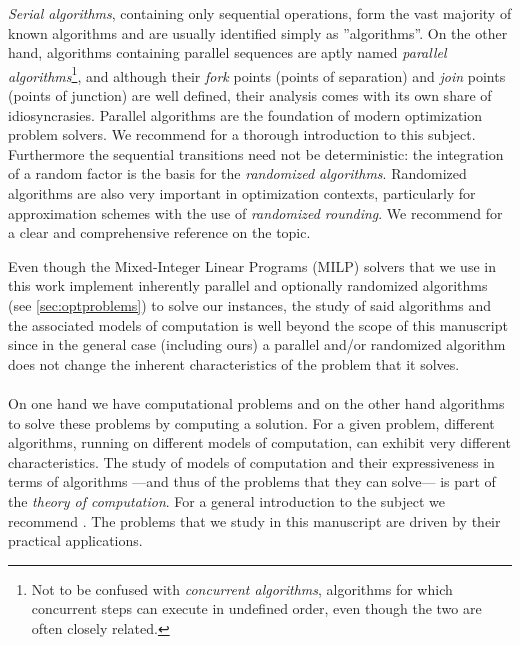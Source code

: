 	\emph{Serial algorithms}, containing only sequential operations, form the vast majority of known algorithms and are usually identified simply as ''algorithms''.
	On the other hand, algorithms containing parallel sequences are aptly named \emph{parallel algorithms}\footnote{Not to be confused with \emph{concurrent algorithms}, algorithms for which concurrent steps can execute in undefined order, even though the two are often closely related.}, and although their \emph{fork} points (points of separation) and \emph{join} points (points of junction) are well defined, their analysis comes with its own share of idiosyncrasies.
	Parallel algorithms are the foundation of modern optimization problem solvers.
	We recommend \parencite{jada1992introduction} for a thorough introduction to this subject.
	Furthermore the sequential transitions need not be deterministic: the integration of a random factor is the basis for the \emph{randomized algorithms}.
	Randomized algorithms are also very important in optimization contexts, particularly for approximation schemes with the use of \emph{randomized rounding}.
	We recommend \parencite[Chapters~5 and 6]{williamson2011design} for a clear and comprehensive reference on the topic.

	Even though the Mixed-Integer Linear Programs (MILP) solvers that we use in this work implement inherently parallel and optionally randomized algorithms (see \cref{sec:optproblems}) to solve our instances, the study of said algorithms and the associated models of computation is well beyond the scope of this manuscript since in the general case (including ours) a parallel and/or randomized algorithm does not change the inherent characteristics of the problem that it solves.

	\paragraph{}
	On one hand we have computational problems and on the other hand algorithms to solve these problems %
		by computing a solution.
	For a given problem, different algorithms, running on different models of computation, can exhibit very different characteristics. %
	The study of models of computation and their expressiveness in terms of algorithms ---and thus of the problems that they can solve--- %
		is part of the \emph{theory of computation}.
	For a general introduction to the subject we recommend \parencite{sipser2012introduction}.
	The problems that we study in this manuscript are driven by their practical applications.

